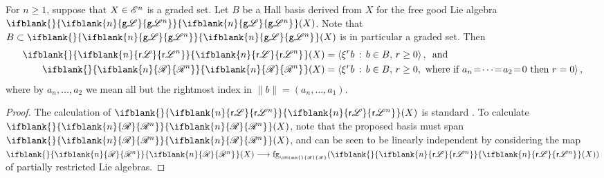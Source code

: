 \documentclass[10pt]{article}
\newcommand{\GS}[1]{\scrE^{#1}}
\newcommand{\RestLie}[1]%
{\ifblank{#1}{\mathsf{r}{\scrL}}{\mathsf{r}{\scrL}^{#1}}}
\newcommand{\GoodLie}[1]%
{\ifblank{#1}{\mathsf{g}{\scrL}}{\mathsf{g}{\scrL}^{#1}}}
\newcommand{\BadLie}[1]%
{\ifblank{#1}{\mathsf{b}{\scrL}}{\mathsf{b}{\scrL}^{#1}}}
\newcommand{\PRLie}[1]%
{\ifblank{#1}{\scrR}{\scrR^{#1}}}
\newcommand{\iteratedrestn}[2]{\xi^{#2}{#1}}
\newcommand{\forget}[1]{\mathrm{fg}_{\smash{\mbox{\tiny $#1$}}}}
\newcommand{\Fr}[2][]{\ifblank{#1}{#2}{#2_{#1}}}
\begin{document}
\begin{CategoriesOfInterest}
\begin{prop}\label{PropBasesOfFreeLieAlgs}
For $n\geq1$, suppose that $X\in\GS{n}$ is a graded set. Let $B$ be a Hall basis derived from $X$ for the free good Lie algebra $\Fr{\GoodLie{n}}(X)$. Note that $B\subset \Fr{\GoodLie{n}}(X)$ is in particular a graded set. Then
\begin{alignat*}{2}
\Fr{\RestLie{n}}(X)
&=
\left\langle \iteratedrestn{b}{r}\,:\,b\in
B,\,r\geq0\right\rangle\textup{, \ and}%
\\
\Fr{\PRLie{n}}(X)
&=
\left\langle \iteratedrestn{b}{r}\,:\,b\in
B,\,r\geq0,\textup{ where if }a_{n}\!=\!\cdots\!=\!a_2\!=\!0\textup{ then $r=0$}\right\rangle,%
\end{alignat*}
where by $a_n,\ldots,a_2$ we mean all but the rightmost index in $\|b\|=(a_{n},\ldots,a_1)$.
\end{prop}
\begin{proof}
The calculation of $\Fr{\RestLie{n}}(X)$ is standard \cite[Proposition 14, p.66]{MR886063}.
To calculate $\Fr{\PRLie{n}}(X)$, note that the proposed basis must span $\Fr{\PRLie{n}}(X)$, and can be seen to be linearly independent by considering the map $\Fr{\PRLie{n}}(X)\to \forget{\PRLie{}}(\Fr{\RestLie{n}}(X))$ of partially restricted Lie algebras.
\end{proof}



\end{CategoriesOfInterest}
\end{document}

